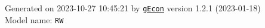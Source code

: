 \documentclass[10pt,a4paper]{article}
\numberwithin{equation}{section}
\begin{document}
\begin{landscape}
\begin{flushleft}{\large
Generated  on 2023-10-27 10:45:21 by \href{http://gecon.r-forge.r-project.org/}{\texttt{gEcon}} version 1.2.1 (2023-01-18)\\
Model name: \verb+RW+
}\end{flushleft}


\end{landscape}

\end{document}

